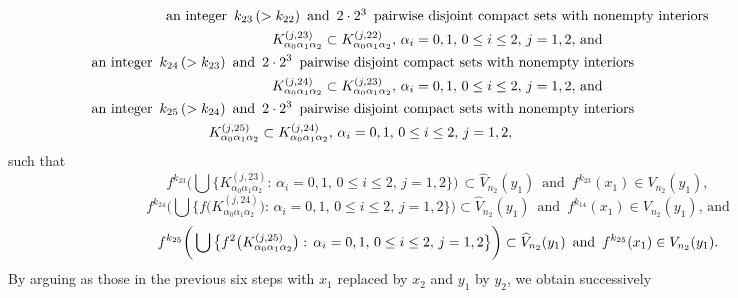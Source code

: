\documentclass[12pt]{article}
\newcommand{\al}{\alpha}
\begin{document}
\begin{multline*}
$$
\text{an integer} \,\,\, k_{23} \, (> k_{22}) \,\,\, \text{and} \,\,\, 2 \cdot 2^3 \,\,\, \text{pairwise disjoint compact sets with nonempty interiors} \\      
K_{\al_0\al_1\al_2}^{(j,23)} \subset K_{\al_0\al_1\al_2}^{(j,22)}, \, \al_i = 0, 1, \, 0 \le i \le 2, \, j = 1, 2, \, \text{and} \\
\,\,\,\,\, \text{an integer} \,\,\, k_{24} \, (> k_{23}) \,\,\, \text{and} \,\,\, 2 \cdot 2^3 \,\,\, \text{pairwise disjoint compact sets with nonempty interiors}\qquad\qquad\qquad\qquad\qquad\quad\,\,\, \\ 
K_{\al_0\al_1\al_2}^{(j,24)} \subset K_{\al_0\al_1\al_2}^{(j,23)}, \, \al_i = 0, 1, \, 0 \le i \le 2, \, j = 1, 2, \, \text{and}  \\
\,\,\,\,\, \text{an integer} \,\,\, k_{25} \, (> k_{24}) \,\,\, \text{and} \,\,\, 2 \cdot 2^3 \,\,\, \text{pairwise disjoint compact sets with nonempty interiors}\qquad\qquad\qquad\qquad\qquad\quad\,\,\, \\ 
K_{\al_0\al_1\al_2}^{(j,25)} \subset K_{\al_0\al_1\al_2}^{(j,24)}, \, \al_i = 0, 1, \, 0 \le i \le 2, \, j = 1, 2, \qquad\qquad\qquad\qquad\qquad\quad
$$
\end{multline*}
such that
$$
f^{k_{23}}\bigg(\bigcup \big\{ K_{\al_0\al_1\al_2}^{(j,23)}: \, \al_i = 0, 1, \, 0 \le i \le 2, \, j = 1, 2 \big\}\bigg) \, \subset \widehat V_{n_2}(y_1) \,\,\, \text{and} \,\,\, f^{k_{23}}(x_1) \in V_{n_2}(y_1),
$$
$$
f^{k_{24}}\bigg(\bigcup \big\{ f\big(K_{\al_0\al_1\al_2}^{(j,24)}\big): \, \al_i = 0, 1, \, 0 \le i \le 2, \, j = 1, 2 \big\}\bigg) \subset \widehat V_{n_2}(y_1) \,\,\, \text{and} \,\,\, f^{k_{14}}(x_1) \in V_{n_2}(y_1),\, \text{and}
$$
$$
f^{k_{25}}\bigg(\bigcup \big\{ f^2\big(K_{\al_0\al_1\al_2}^{(j,25)}\big): \, \al_i = 0, 1, \, 0 \le i \le 2, \, j = 1, 2 \big\}\bigg) \subset \widehat V_{n_2}(y_1) \,\,\, \text{and} \,\,\, f^{k_{25}}(x_1) \in V_{n_2}(y_1).\vspace{.1in}
$$
\indent By arguing as those in the previous six steps with $x_1$ replaced by $x_2$ and $y_1$ by $y_2$, we obtain successively
\end{document}
